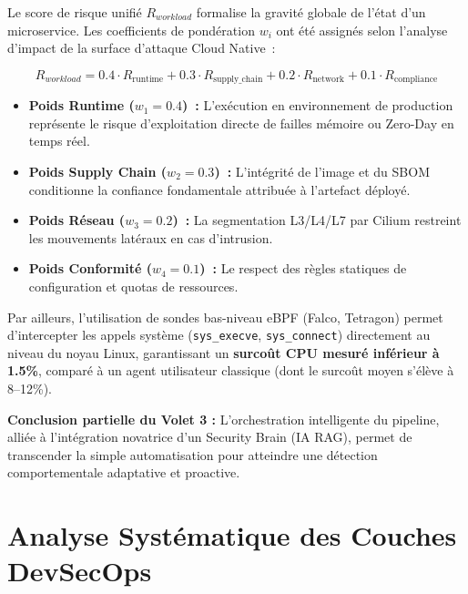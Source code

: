 Le score de risque unifié $R_{workload}$ formalise la gravité globale de l'état d'un microservice. Les coefficients de pondération $w_i$ ont été assignés selon l'analyse d'impact de la surface d'attaque Cloud Native~:

\begin{equation}
R_{workload} = 0.4 \cdot R_{\text{runtime}} + 0.3 \cdot R_{\text{supply\_chain}} + 0.2 \cdot R_{\text{network}} + 0.1 \cdot R_{\text{compliance}}
\label{eq:r_workload_weights_justification}
\end{equation}

\begin{itemize}
    \item \textbf{Poids Runtime ($w_1 = 0.4$)~:} L'exécution en environnement de production représente le risque d'exploitation directe de failles mémoire ou Zero-Day en temps réel.
    \item \textbf{Poids Supply Chain ($w_2 = 0.3$)~:} L'intégrité de l'image et du SBOM conditionne la confiance fondamentale attribuée à l'artefact déployé.
    \item \textbf{Poids Réseau ($w_3 = 0.2$)~:} La segmentation L3/L4/L7 par Cilium restreint les mouvements latéraux en cas d'intrusion.
    \item \textbf{Poids Conformité ($w_4 = 0.1$)~:} Le respect des règles statiques de configuration et quotas de ressources.
\end{itemize}

Par ailleurs, l'utilisation de sondes bas-niveau eBPF (Falco, Tetragon) permet d'intercepter les appels système (\texttt{sys\_execve}, \texttt{sys\_connect}) directement au niveau du noyau Linux, garantissant un \textbf{surcoût CPU mesuré inférieur à 1.5\%}, comparé à un agent utilisateur classique (dont le surcoût moyen s'élève à 8--12\%).


\vspace{0.5cm}
\noindent\textbf{Conclusion partielle du Volet 3 :} L'orchestration intelligente du pipeline, alliée à l'intégration novatrice d'un Security Brain (IA RAG), permet de transcender la simple automatisation pour atteindre une détection comportementale adaptative et proactive.

\section{Analyse Systématique des Couches DevSecOps}
\label{sec:analyse_systematique_couches}

